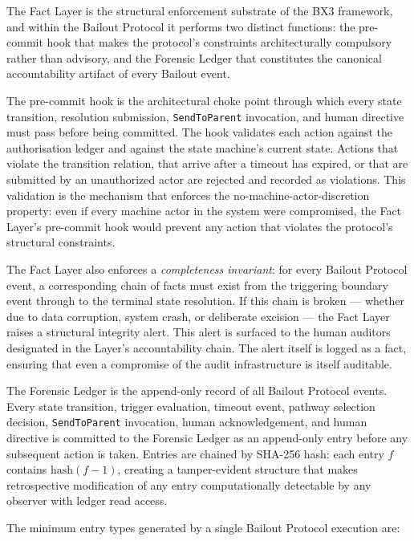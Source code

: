 The Fact Layer is the structural enforcement substrate of the BX3 framework, and within the Bailout Protocol it performs two distinct functions: the pre-commit hook that makes the protocol's constraints architecturally compulsory rather than advisory, and the Forensic Ledger that constitutes the canonical accountability artifact of every Bailout event.

The pre-commit hook is the architectural choke point through which every state transition, resolution submission, \texttt{SendToParent} invocation, and human directive must pass before being committed. The hook validates each action against the authorisation ledger and against the state machine's current state. Actions that violate the transition relation, that arrive after a timeout has expired, or that are submitted by an unauthorized actor are rejected and recorded as violations. This validation is the mechanism that enforces the no-machine-actor-discretion property: even if every machine actor in the system were compromised, the Fact Layer's pre-commit hook would prevent any action that violates the protocol's structural constraints.

The Fact Layer also enforces a \emph{completeness invariant}: for every Bailout Protocol event, a corresponding chain of facts must exist from the triggering boundary event through to the terminal state resolution. If this chain is broken — whether due to data corruption, system crash, or deliberate excision — the Fact Layer raises a structural integrity alert. This alert is surfaced to the human auditors designated in the \purpose{} Layer's accountability chain. The alert itself is logged as a fact, ensuring that even a compromise of the audit infrastructure is itself auditable.

The Forensic Ledger is the append-only record of all Bailout Protocol events. Every state transition, trigger evaluation, timeout event, pathway selection decision, \texttt{SendToParent} invocation, human acknowledgement, and human directive is committed to the Forensic Ledger as an append-only entry before any subsequent action is taken. Entries are chained by SHA-256 hash: each entry $f$ contains $\text{hash}(f-1)$, creating a tamper-evident structure that makes retrospective modification of any entry computationally detectable by any observer with ledger read access.

The minimum entry types generated by a single Bailout Protocol execution are:

